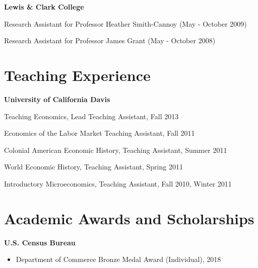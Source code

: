 \documentclass[margin,line]{res}
\newenvironment{list1}{
  \begin{list}{\ding{113}}{%
      \setlength{\itemsep}{0in}
      \setlength{\parsep}{0in} \setlength{\parskip}{0in}
      \setlength{\topsep}{0in} \setlength{\partopsep}{0in} 
      \setlength{\leftmargin}{0.17in}}}{\end{list}}
\begin{document}
\begin{resume}
\textbf{Lewis \& Clark College}
\begin{list1}
 \setlength{\itemsep}{0cm}%
  \setlength{\parskip}{0cm}%
	\item[] Research Assistant for Professor Heather Smith-Cannoy (May - October 2009)
	\item[] Research Assistant for Professor James Grant (May - October 2008)
\end{list1}

\section{\sc Teaching Experience}
\textbf{University of California Davis}
\begin{list1}
 \setlength{\itemsep}{0cm}%
  \setlength{\parskip}{0cm}%
	\item[] Teaching Economics, Lead Teaching Assistant, Fall 2013
	\item[] Economics of the Labor Market Teaching Assistant, Fall 2011
	\item[] Colonial American Economic History, Teaching Assistant, Summer 2011
	\item[] World Economic History, Teaching Assistant, Spring 2011 
	\item[] Introductory Microeconomics, Teaching Assistant, Fall 2010, Winter 2011
\end{list1}




\section{\sc Academic Awards and Scholarships} 
\textbf{U.S. Census Bureau} 
\begin{itemize}
	 \setlength{\itemsep}{0cm}%
  \setlength{\parskip}{0cm}%
	\item Department of Commerce Bronze Medal Award (Individual), 2018
\end{itemize}


\end{resume}
\end{document}
